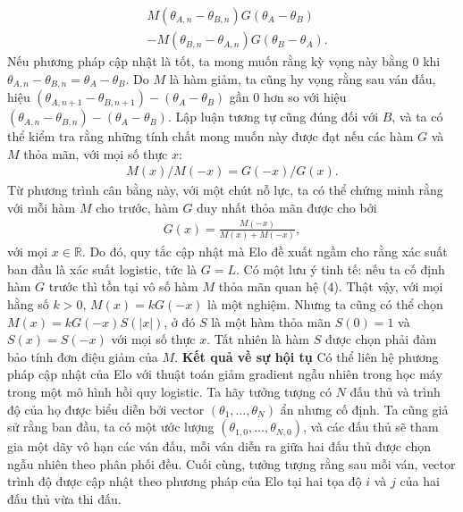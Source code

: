 \begin{multicols}{2}
	\begin{align*}
		&M(\theta_{A, n} - \theta_{B, n}) G(\theta_A - \theta_B)\\
		&- M(\theta_{B, n} - \theta_{A, n}) G(\theta_B - \theta_A).
	\end{align*}
	Nếu phương pháp cập nhật là tốt, ta mong muốn rằng kỳ vọng này bằng $0$ khi $\theta_{A, n} - \theta_{B, n} = \theta_A - \theta_B$. Do $M$ là hàm giảm, ta cũng hy vọng rằng sau ván đấu, hiệu $(\theta_{A, n + 1} - \theta_{B, n + 1}) - (\theta_A - \theta_B)$ gần $0$ hơn so với hiệu $(\theta_{A, n} - \theta_{B, n}) - (\theta_A - \theta_B)$.
	\vskip 0.01cm
	Lập luận tương tự cũng đúng đối với $B$, và ta có thể kiểm tra rằng những tính chất mong muốn này được đạt nếu các hàm $G$ và $M$ thỏa mãn, với mọi số thực $x$:
	\begin{align*}
		M(x) / M(-x) = G(-x) / G(x). \tag{$4$}
	\end{align*}
	Từ phương trình cân bằng này, với một chút nỗ lực, ta có thể chứng minh rằng với mỗi hàm $M$ cho trước, hàm $G$ duy nhất thỏa mãn được cho bởi
	\begin{align*}
		G(x) = \frac { M(-x) }{ M(x) + M(-x) },
	\end{align*}
	với mọi $x \in \mathbb R$.
	\vskip 0.01cm
	Do đó, quy tắc cập nhật mà Elo đề xuất ngầm cho rằng xác suất ban đầu là xác suất logistic, tức là $G = L$.
	\vskip 0.01cm
	Có một lưu ý tinh tế: nếu ta cố định hàm $G$ trước thì tồn tại vô số hàm $M$ thỏa mãn quan hệ ($4$). Thật vậy, với mọi hằng số $k > 0$, $M(x) = k G(-x)$ là một nghiệm. Nhưng ta cũng có thể chọn $M(x) = k G(-x) S(|x|)$, ở đó $S$ là một hàm thỏa mãn $S(0) = 1$ và $S(x) = S(-x)$ với mọi số thực $x$. Tất nhiên là hàm $S$ được chọn phải đảm bảo tính đơn điệu giảm của $M$.
	\vskip 0.05cm
	\textbf{\color{toanhocdoisong}Kết quả về sự hội tụ}
	\vskip 0.05cm
	Có thể liên hệ phương pháp cập nhật của Elo với thuật toán giảm gradient ngẫu nhiên trong học máy trong một mô hình hồi quy logistic.
	\vskip 0.05cm
	Ta hãy tưởng tượng có $N$ đấu thủ và trình độ của họ được biểu diễn bởi vector $(\theta_1, \dots, \theta_N)$ ẩn nhưng cố định. Ta cũng giả sử rằng ban đầu, ta có một ước lượng $(\theta_{1, 0}, \dots, \theta_{N, 0})$, và các đấu thủ sẽ tham gia một dãy vô hạn các ván đấu, mỗi ván diễn ra giữa hai đấu thủ được chọn ngẫu nhiên theo phân phối đều. Cuối cùng, tưởng tượng rằng sau mỗi ván, vector trình độ được cập nhật theo phương pháp của Elo tại hai tọa độ $i$ và $j$ của hai đấu thủ vừa thi đấu.
\end{multicols}
\vspace*{-8pt}
